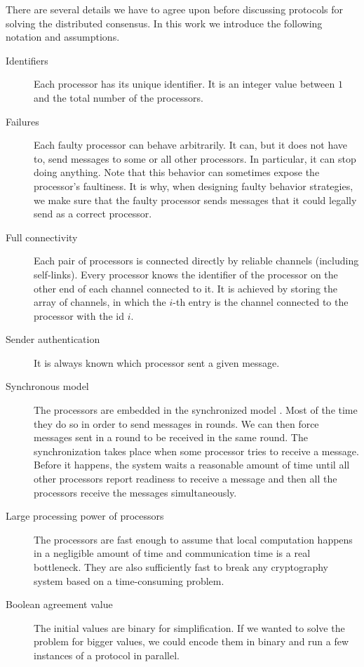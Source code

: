 There are several details we have to agree upon before discussing protocols for solving the distributed consensus. In this work we introduce the following notation and assumptions.

\begin{description}
    \item[Identifiers] Each processor has its unique identifier. It is an integer value between $1$ and the total number of the processors.
    \item[Failures] Each faulty processor can behave arbitrarily. It can, but it does not have to, send messages to some or all other processors. In particular, it can stop doing anything. Note that this behavior can sometimes expose the processor's faultiness. It is why, when designing faulty behavior strategies, we make sure that the faulty processor sends messages that it could legally send as a correct processor.
    \item[Full connectivity] Each pair of processors is connected directly by reliable channels (including self-links). Every processor knows the identifier of the processor on the other end of each channel connected to it. It is achieved by storing the array of channels, in which the $i$-th entry is the channel connected to the processor with the id $i$.
    \item[Sender authentication] It is always known which processor sent a given message.
    \item[Synchronous model] The processors are embedded in the synchronized model \cite{L96}. Most of the time they do so in order to send messages in rounds. We can then force messages sent in a round to be received in the same round. The synchronization takes place when some processor tries to receive a message. Before it happens, the system waits a reasonable amount of time until all other processors report readiness to receive a message and then all the processors receive the messages simultaneously.
    \item[Large processing power of processors] The processors are fast enough to assume that local computation happens in a negligible amount of time and communication time is a real bottleneck. They are also sufficiently fast to break any cryptography system based on a time-consuming problem.
    \item[Boolean agreement value] The initial values are binary for simplification. If we wanted to solve the problem for bigger values, we could encode them in binary and run a few instances of a protocol in parallel.
\end{description}